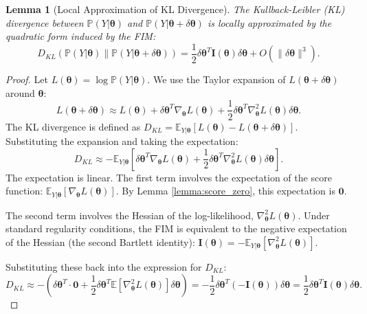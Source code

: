\documentclass{article}
\newtheorem{lemma}[theorem]{Lemma}
\theoremstyle{definition}
\begin{document}
\begin{lemma}[Local Approximation of KL Divergence]
\label{lemma:kl_approx}
The Kullback-Leibler (KL) divergence between $\mathbb{P}(Y|\boldsymbol{\theta})$ and $\mathbb{P}(Y|\boldsymbol{\theta} + \delta\boldsymbol{\theta})$ is locally approximated by the quadratic form induced by the FIM:
\begin{equation}
    D_{KL}(\mathbb{P}(Y|\boldsymbol{\theta}) \| \mathbb{P}(Y|\boldsymbol{\theta} + \delta\boldsymbol{\theta})) = \frac{1}{2} \delta\boldsymbol{\theta}^T \mathbf{I}(\boldsymbol{\theta}) \delta\boldsymbol{\theta} + O(\|\delta\boldsymbol{\theta}\|^3).
\end{equation}
\end{lemma}
\begin{proof}
Let $L(\boldsymbol{\theta}) = \log \mathbb{P}(Y|\boldsymbol{\theta})$. We use the Taylor expansion of $L(\boldsymbol{\theta}+\delta\boldsymbol{\theta})$ around $\boldsymbol{\theta}$:
\begin{equation}
    L(\boldsymbol{\theta}+\delta\boldsymbol{\theta}) \approx L(\boldsymbol{\theta}) + \delta\boldsymbol{\theta}^T \nabla_{\boldsymbol{\theta}} L(\boldsymbol{\theta}) + \frac{1}{2} \delta\boldsymbol{\theta}^T \nabla_{\boldsymbol{\theta}}^2 L(\boldsymbol{\theta}) \delta\boldsymbol{\theta}.
\end{equation}
The KL divergence is defined as $D_{KL} = \mathbb{E}_{Y|\boldsymbol{\theta}}[L(\boldsymbol{\theta}) - L(\boldsymbol{\theta}+\delta\boldsymbol{\theta})]$. Substituting the expansion and taking the expectation:
\begin{equation}
    D_{KL} \approx - \mathbb{E}_{Y|\boldsymbol{\theta}} \left[ \delta\boldsymbol{\theta}^T \nabla_{\boldsymbol{\theta}} L(\boldsymbol{\theta}) + \frac{1}{2} \delta\boldsymbol{\theta}^T \nabla_{\boldsymbol{\theta}}^2 L(\boldsymbol{\theta}) \delta\boldsymbol{\theta} \right].
\end{equation}
The expectation is linear. The first term involves the expectation of the score function: $\mathbb{E}_{Y|\boldsymbol{\theta}}[\nabla_{\boldsymbol{\theta}} L(\boldsymbol{\theta})]$. By Lemma \ref{lemma:score_zero}, this expectation is $\mathbf{0}$.

The second term involves the Hessian of the log-likelihood, $\nabla_{\boldsymbol{\theta}}^2 L(\boldsymbol{\theta})$. Under standard regularity conditions, the FIM is equivalent to the negative expectation of the Hessian (the second Bartlett identity): $\mathbf{I}(\boldsymbol{\theta}) = - \mathbb{E}_{Y|\boldsymbol{\theta}}[\nabla_{\boldsymbol{\theta}}^2 L(\boldsymbol{\theta})]$.

Substituting these back into the expression for $D_{KL}$:
\begin{equation}
    D_{KL} \approx - \left( \delta\boldsymbol{\theta}^T \cdot \mathbf{0} + \frac{1}{2} \delta\boldsymbol{\theta}^T \mathbb{E}[\nabla_{\boldsymbol{\theta}}^2 L(\boldsymbol{\theta})] \delta\boldsymbol{\theta} \right) = - \frac{1}{2} \delta\boldsymbol{\theta}^T (-\mathbf{I}(\boldsymbol{\theta})) \delta\boldsymbol{\theta} = \frac{1}{2} \delta\boldsymbol{\theta}^T \mathbf{I}(\boldsymbol{\theta}) \delta\boldsymbol{\theta}.
\end{equation}
\end{proof}
\end{document}
